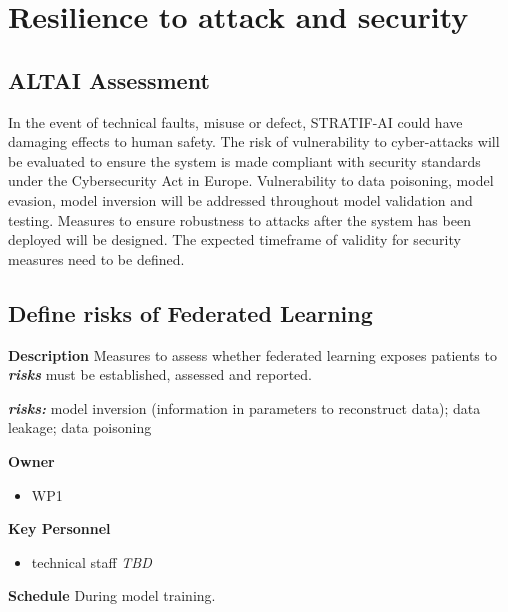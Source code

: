 \documentclass[
  letterpaper,
  DIV=11,
  numbers=noendperiod]{scrreport}
\providecommand{\tightlist}{%
  \setlength{\itemsep}{0pt}\setlength{\parskip}{0pt}}\usepackage{longtable,booktabs,array}
\begin{document}
\hypertarget{resilience-to-attack-and-security}{%
\section{Resilience to attack and
security}\label{resilience-to-attack-and-security}}

\hypertarget{altai-assessment-2}{%
\subsection*{ALTAI Assessment}\label{altai-assessment-2}}

In the event of technical faults, misuse or defect, STRATIF-AI could
have damaging effects to human safety. The risk of vulnerability to
cyber-attacks will be evaluated to ensure the system is made compliant
with security standards under the Cybersecurity Act in Europe.
Vulnerability to data poisoning, model evasion, model inversion will be
addressed throughout model validation and testing. Measures to ensure
robustness to attacks after the system has been deployed will be
designed. The expected timeframe of validity for security measures need
to be defined.

\hypertarget{define-risks-of-federated-learning}{%
\subsection{Define risks of Federated
Learning}\label{define-risks-of-federated-learning}}

\textbf{Description} Measures to assess whether federated learning
exposes patients to \textbf{\emph{risks}} must be established, assessed
and reported.

\textbf{\emph{risks:}} model inversion (information in parameters to
reconstruct data); data leakage; data poisoning

\textbf{Owner}

\begin{itemize}
\tightlist
\item
  WP1
\end{itemize}

\textbf{Key Personnel}

\begin{itemize}
\tightlist
\item
  technical staff \emph{TBD}
\end{itemize}

\textbf{Schedule} During model training.
\end{document}
